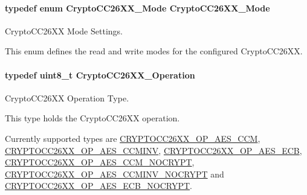 \paragraph[{Crypto\-C\-C26\-X\-X\-\_\-\-Mode}]{\setlength{\rightskip}{0pt plus 5cm}typedef enum {\bf Crypto\-C\-C26\-X\-X\-\_\-\-Mode}  {\bf Crypto\-C\-C26\-X\-X\-\_\-\-Mode}}\label{_crypto_c_c26_x_x_8h_a2a7a223869fb2c7f4b577f3552563d16}


Crypto\-C\-C26\-X\-X Mode Settings. 

This enum defines the read and write modes for the configured Crypto\-C\-C26\-X\-X. 
\paragraph[{Crypto\-C\-C26\-X\-X\-\_\-\-Operation}]{\setlength{\rightskip}{0pt plus 5cm}typedef uint8\-\_\-t {\bf Crypto\-C\-C26\-X\-X\-\_\-\-Operation}}\label{_crypto_c_c26_x_x_8h_a28465385e5b45efecc00f2015605f970}


Crypto\-C\-C26\-X\-X Operation Type. 

This type holds the Crypto\-C\-C26\-X\-X operation.

Currently supported types are \hyperlink{_crypto_c_c26_x_x_8h_a6ab0b59b64c06856c431f91a7e43b34d}{C\-R\-Y\-P\-T\-O\-C\-C26\-X\-X\-\_\-\-O\-P\-\_\-\-A\-E\-S\-\_\-\-C\-C\-M}, \hyperlink{_crypto_c_c26_x_x_8h_a38c8bce4f77947e99d2d877e8d3dee7e}{C\-R\-Y\-P\-T\-O\-C\-C26\-X\-X\-\_\-\-O\-P\-\_\-\-A\-E\-S\-\_\-\-C\-C\-M\-I\-N\-V}, \hyperlink{_crypto_c_c26_x_x_8h_a9e96510f981e65f0c46c19684daaff07}{C\-R\-Y\-P\-T\-O\-C\-C26\-X\-X\-\_\-\-O\-P\-\_\-\-A\-E\-S\-\_\-\-E\-C\-B}, \hyperlink{_crypto_c_c26_x_x_8h_acc1c159d62112b90da86ecd846994f98}{C\-R\-Y\-P\-T\-O\-C\-C26\-X\-X\-\_\-\-O\-P\-\_\-\-A\-E\-S\-\_\-\-C\-C\-M\-\_\-\-N\-O\-C\-R\-Y\-P\-T}, \hyperlink{_crypto_c_c26_x_x_8h_a445002cd50ecda94d48f437bc213a499}{C\-R\-Y\-P\-T\-O\-C\-C26\-X\-X\-\_\-\-O\-P\-\_\-\-A\-E\-S\-\_\-\-C\-C\-M\-I\-N\-V\-\_\-\-N\-O\-C\-R\-Y\-P\-T} and \hyperlink{_crypto_c_c26_x_x_8h_aea29a252e094057f90d0fccd938b8a0d}{C\-R\-Y\-P\-T\-O\-C\-C26\-X\-X\-\_\-\-O\-P\-\_\-\-A\-E\-S\-\_\-\-E\-C\-B\-\_\-\-N\-O\-C\-R\-Y\-P\-T}. 
